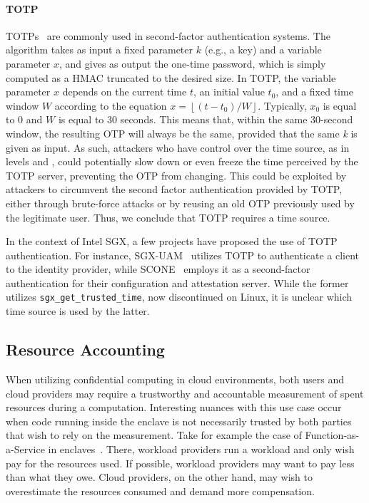 \paragraph{TOTP}
%
\Acp{TOTP}~\cite{rfc6238} are commonly used in second-factor authentication
systems. The algorithm takes as input a fixed parameter $k$ (e.g., a key) and a
variable parameter $x$, and gives as output the one-time password, which is
simply computed as a HMAC truncated to the desired size. In \ac{TOTP}, the
variable parameter $x$ depends on the current time $t$, an initial value $t_0$,
and a fixed time window $W$ according to the equation $x = \left\lfloor(t -
t_0)/W\right\rfloor$. Typically, $x_0$ is equal to 0 and $W$ is equal to 30
seconds. This means that, within the same 30-second window, the resulting OTP
will always be the same, provided that the same \emph{k} is given as input. As
such, attackers who have control over the time source, as in levels \Tzero and
\Tone, could potentially slow down or even freeze the time perceived by the
\ac{TOTP} server, preventing the OTP from changing. This could be exploited by
attackers to circumvent the second factor authentication provided by \ac{TOTP},
either through brute-force attacks or by reusing an old OTP previously used by
the legitimate user. Thus, we conclude that \ac{TOTP} %
requires a \Ttwo time source.

In the context of Intel SGX, a few projects have proposed the use of \ac{TOTP}
authentication. For instance, SGX-UAM~\cite{wu2021sgx} utilizes \ac{TOTP} to
authenticate a client to the identity provider, while SCONE~\cite{scone2fa}
employs it as a second-factor authentication for their configuration and
attestation server. While the former utilizes \texttt{sgx\_get\_trusted\_time},
now discontinued on Linux, it is unclear which time source is used by the
latter.

\subsection{Resource Accounting}

When utilizing confidential computing in cloud environments, both users and
cloud providers may require a trustworthy and accountable measurement of spent
resources during a computation. Interesting nuances with this use case occur
when code running inside the enclave is not necessarily trusted by both parties
that wish to rely on the measurement. Take for example the case of
Function-as-a-Service in enclaves~\cite{sfaas}. There, workload providers run a
workload and only wish pay for the resources used. If possible, workload
providers may want to pay less than what they owe. Cloud providers, on the other
hand, may wish to overestimate the resources consumed and demand more
compensation.

